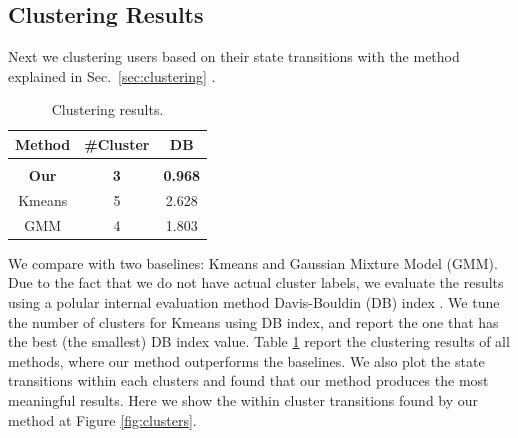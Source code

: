 \subsection{Clustering Results}
Next we clustering users based on their state transitions with the method explained in Sec.\ \ref{sec:clustering} . 
\begin{table}
\caption{Clustering results.}
\label{tab:clustering}
\begin{tabular}{ccc}
\bf Method & \bf \#Cluster & \bf DB
\\ \hline \\
{\bf Our}     & {\bf 3}  &  {\bf 0.968} \\  
Kmeans  &  5  &  2.628 \\
GMM     &  4  &  1.803 
\end{tabular}
\end{table} 
We compare with two baselines: Kmeans and Gaussian Mixture Model (GMM). 
Due to the fact that we do not have actual cluster labels, we evaluate the results using a polular
internal evaluation method Davis-Bouldin (DB) index \cite{dbindex}. 
We tune the number of clusters for Kmeans using DB index, and report the one that has the best (the smallest) DB index value. 
Table \ref{tab:clustering} report the clustering results of all methods, 
where our method outperforms the baselines. We also plot the state transitions within each clusters  
and found that our method produces the most meaningful results. Here we show the within cluster transitions found by our
method at Figure \ref{fig:clusters}.  


